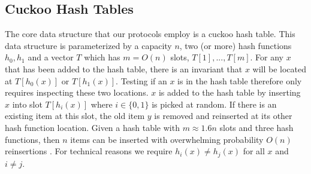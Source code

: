 \subsection{Cuckoo Hash Tables}

The core data structure that our protocols employ is a cuckoo hash table. This data structure is parameterized by a capacity $n$, two (or more) hash functions $h_0, h_1$ and a vector $T$ which has $m=O(n)$ slots, $T[1], ..., T[m]$. For any $x$ that has been added to the hash table, there is an invariant that $x$ will be located at $T[{h_0(x)}]$ or $T[{h_1(x)}]$. Testing if an $x$ is in the hash table therefore only requires inspecting these two locations. $x$ is added to the hash table by inserting $x$ into slot $T[h_i(x)]$ where $i\in \{0,1\}$ is picked at random. If there is an existing item at this slot, the old item $y$ is removed and reinserted at its other hash function location. Given a hash table with $m\approx1.6n$ slots and three hash functions, then $n$ items can be inserted with overwhelming probability $O(n)$ reinsertions \cite{DRRT18}. For technical reasons we require $h_i(x)\neq h_j(x)$ for all $x$ and $i\neq j$. 